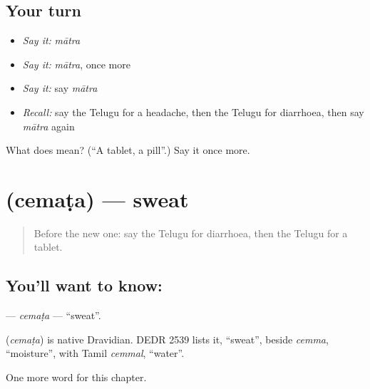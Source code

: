 \subsection*{Your turn}
\begin{itemize}
\raggedright
  \item \emph{Say it:} \emph{mātra}
  \item \emph{Say it:} \emph{mātra}, once more
  \item \emph{Say it:} say \emph{mātra}
  \item \emph{Recall:} say the Telugu for a headache, then the Telugu for diarrhoea, then say \emph{mātra} again
\end{itemize}

\begin{tcolorbox}[breakable,colback=teal!4,colframe=teal!35!black,title={Before you move on}]
What does  mean? (\textquotedblleft{}A tablet, a pill\textquotedblright{}.) Say it once more.
\end{tcolorbox}
\section[\texorpdfstring{\te{చెమట} (cemaṭa)}{చెమట (cemaṭa)}]{ (cemaṭa) — sweat}

\label{lesson:TE-C167-cemata}



\begin{quote}
Before the new one: say the Telugu for diarrhoea, then the Telugu for a tablet.
\end{quote}

\subsection*{You'll want to know: }
\textbf{} — \emph{cemaṭa} — \textquotedblleft{}sweat\textquotedblright{}.

\begin{cousinweb}
\textbf{} (\emph{cemaṭa}) is native Dravidian. DEDR 2539 lists it, \textquotedblleft{}sweat\textquotedblright{}, beside \emph{cemma}, \textquotedblleft{}moisture\textquotedblright{}, with Tamil \emph{cemmal}, \textquotedblleft{}water\textquotedblright{}.
\end{cousinweb}

\begin{grammarlens}[title={What you've built}]
One more word for this chapter.
\end{grammarlens}

